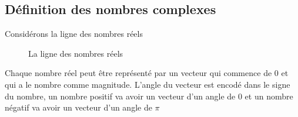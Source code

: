 

\subsection{Définition des nombres complexes}
Considérons la ligne des nombres réels
\begin{figure}[!htbp]
\begin{center}
\def\numberLineLastNumber{7}
\end{center}
\caption{La ligne des nombres réels}
\end{figure}
\begin{remark}
    Chaque nombre réel peut être représenté par un vecteur qui commence de 0 et qui a le nombre comme magnitude. L'angle du vecteur est encodé dans le signe du nombre, un nombre positif va avoir un vecteur d'un angle de 0 et un nombre négatif va avoir un vecteur d'un angle de $\pi$
\end{remark}

